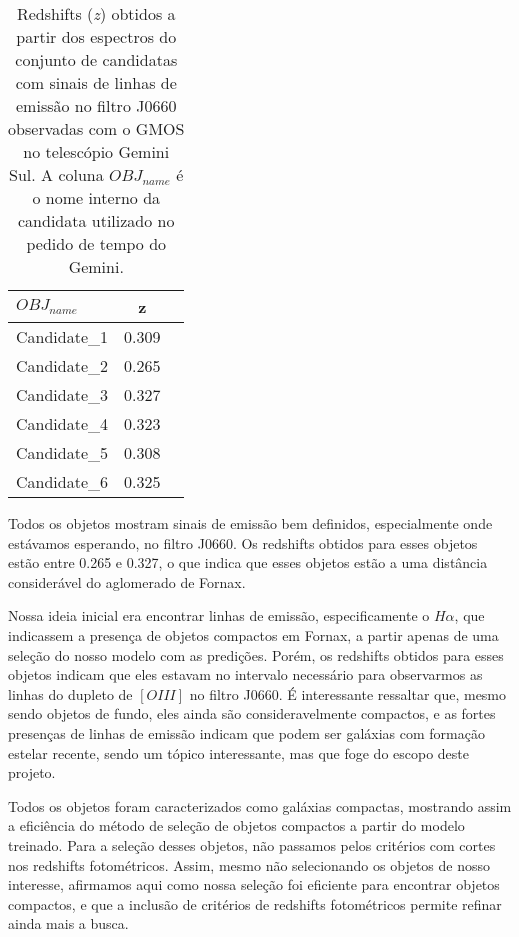 \begin{table}[!ht]
    \centering
    \caption{Redshifts (\textit{z}) obtidos a partir dos espectros do conjunto de candidatas com sinais de linhas de emissão no filtro J0660 observadas com o GMOS no telescópio Gemini Sul. A coluna $OBJ_{name}$ é o nome interno da candidata utilizado no pedido de tempo do Gemini.} 
    \begin{tabular}{lcc}
        \toprule
        $OBJ_{name}$ & z   \\
        \midrule
        Candidate\_1     & 0.309 \\
        Candidate\_2     & 0.265 \\
        Candidate\_3     & 0.327 \\
        Candidate\_4     & 0.323 \\
        Candidate\_5     & 0.308 \\
        Candidate\_6     & 0.325 \\
        \bottomrule
    \end{tabular}
    \label{redshift_candidatas_2}
\end{table}

Todos os objetos mostram sinais de emissão bem definidos, especialmente onde estávamos esperando, no filtro J0660. Os redshifts obtidos para esses objetos estão entre 0.265 e 0.327, o que indica que esses objetos estão a uma distância considerável do aglomerado de Fornax.

Nossa ideia inicial era encontrar linhas de emissão, especificamente o $H\alpha$, que indicassem a presença de objetos compactos em Fornax, a partir apenas de uma seleção do nosso modelo com as predições. Porém, os redshifts obtidos para esses objetos indicam que eles estavam no intervalo necessário para observarmos as linhas do dupleto de $[OIII]$ no filtro J0660. É interessante ressaltar que, mesmo sendo objetos de fundo, eles ainda são consideravelmente compactos, e as fortes presenças de linhas de emissão indicam que podem ser galáxias com formação estelar recente, sendo um tópico interessante, mas que foge do escopo deste projeto.

Todos os objetos foram caracterizados como galáxias compactas, mostrando assim a eficiência do método de seleção de objetos compactos a partir do modelo treinado. Para a seleção desses objetos, não passamos pelos critérios com cortes nos redshifts fotométricos. Assim, mesmo não selecionando os objetos de nosso interesse, afirmamos aqui como nossa seleção foi eficiente para encontrar objetos compactos, e que a inclusão de critérios de redshifts fotométricos permite refinar ainda mais a busca.

